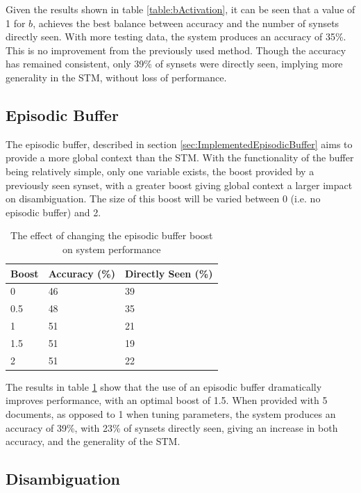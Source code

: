 \documentclass[]{article}
\begin{document}
Given the results shown in table \ref{table:bActivation}, it can be seen that a value of 1 for $b$, achieves the best balance between accuracy and the number of synsets directly seen. With more testing data, the system produces an accuracy of 35\%. This is no improvement from the previously used method. Though the accuracy has remained consistent, only 39\% of synsets were directly seen, implying more generality in the STM, without loss of performance.

\subsection{Episodic Buffer}
\label{sec:EvEpisodicBuffer}
The episodic buffer, described in section \ref{sec:ImplementedEpisodicBuffer} aims to provide a more global context than the STM. With the functionality of the buffer being relatively simple, only one variable exists, the boost provided by a previously seen synset, with a greater boost giving global context a larger impact on disambiguation. The size of this boost will be varied between 0 (i.e. no episodic buffer) and 2.

\begin{table}
\begin{center}
\begin{tabular}{|p{2em}|p{7em}|p{7em}|}
	\hline
	Boost & Accuracy (\%) & Directly Seen (\%) \\
	\hline
	0 & 46 & 39\\
	\hline
	0.5 & 48 & 35\\
	\hline
	1 & 51 & 21\\
	\hline
	1.5 & 51 & 19\\
	\hline
	2 & 51 & 22\\
	\hline
\end{tabular}
\end{center}
\caption{The effect of changing the episodic buffer boost on system performance}
\label{table:EBboost}
\end{table}

The results in table \ref{table:EBboost} show that the use of an episodic buffer dramatically improves performance, with an optimal boost of 1.5. When provided with 5 documents, as opposed to 1 when tuning parameters, the system produces an accuracy of 39\%, with 23\% of synsets directly seen, giving an increase in both accuracy, and the generality of the STM. 

\subsection{Disambiguation}
\label{sec:EvDisambiguation}
\end{document}
